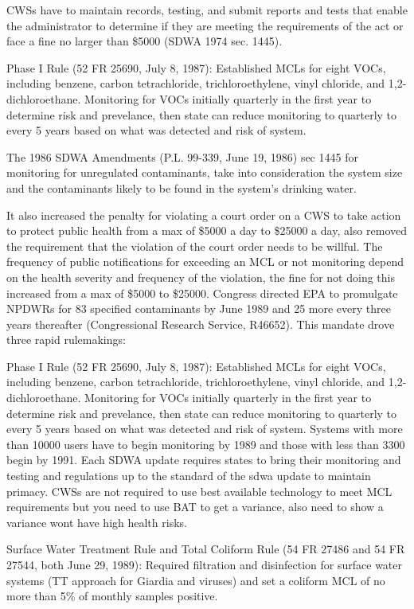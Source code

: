 CWSs have to maintain records, testing, and submit reports and tests that enable the administrator to determine if they are meeting the requirements of the act or face a fine no larger than \$5000 (SDWA 1974 sec. 1445).


Phase I Rule (52 FR 25690, July 8, 1987): Established MCLs for eight VOCs, including benzene, carbon tetrachloride, trichloroethylene, vinyl chloride, and 1,2-dichloroethane. Monitoring for VOCs initially quarterly in the first year to determine risk and prevelance, then state can reduce monitoring to quarterly to every 5 years based on what was detected and risk of system.

The 1986 SDWA Amendments (P.L. 99-339, June 19, 1986) sec 1445 for monitoring for unregulated contaminants, take into consideration the system size and the contaminants likely to be found in the system's drinking water. 

It also increased the penalty for violating a court order on a CWS to take action to protect public health from a max of \$5000 a day to \$25000 a day, also removed the requirement that the violation of the court order needs to be willful. The frequency of public notifications for exceeding an MCL or not monitoring depend on the health severity and frequency of the violation, the fine for not doing this increased from a max of \$5000 to \$25000. Congress directed EPA to promulgate NPDWRs for 83 specified contaminants by June 1989 and 25 more every three years thereafter (Congressional Research Service, R46652). This mandate drove three rapid rulemakings:

Phase I Rule (52 FR 25690, July 8, 1987): Established MCLs for eight VOCs, including benzene, carbon tetrachloride, trichloroethylene, vinyl chloride, and 1,2-dichloroethane. Monitoring for VOCs initially quarterly in the first year to determine risk and prevelance, then state can reduce monitoring to quarterly to every 5 years based on what was detected and risk of system. Systems with more than 10000 users have to begin monitoring by 1989 and those with less than 3300 begin by 1991. Each SDWA update requires states to bring their monitoring and testing and regulations up to the standard of the sdwa update to maintain primacy. CWSs are not required to use best available technology to meet MCL requirements but you need to use BAT to get a variance, also need to show a variance wont have high health risks.


Surface Water Treatment Rule and Total Coliform Rule (54 FR 27486 and 54 FR 27544, both June 29, 1989): Required filtration and disinfection for surface water systems (TT approach for Giardia and viruses) and set a coliform MCL of no more than 5\% of monthly samples positive.

